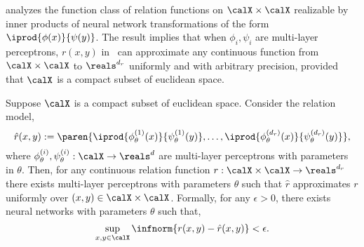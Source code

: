 
\citep{arxivInnerprodUnivApprox} analyzes the function class of relation functions on $\calX \times \calX$ realizable by inner products of neural network transformations of the form $\iprod{\phi(x)}{\psi(y)}$. The result implies that when $\phi_i, \psi_i$ are multi-layer perceptrons, $r(x,y)$ in~ can approximate any continuous function from $\calX \times \calX$ to $\reals^{d_r}$ uniformly and with arbitrary precision, provided that $\calX$ is a compact subset of euclidean space.

\begin{theorem}
    Suppose $\calX$ is a compact subset of euclidean space. Consider the relation model,
    \begin{equation*}
        \hat{r}(x, y) := \paren{\iprod{\phi_\theta^{(1)}(x)}{\psi_\theta^{(1)}(y)}, \ldots, \iprod{\phi_\theta^{(d_r)}(x)}{\psi_\theta^{(d_r)}(y)}},
    \end{equation*}
    \noindent where $\phi_\theta^{(i)}, \psi_\theta^{(i)}: \calX \to \reals^d$ are multi-layer perceptrons with parameters in $\theta$. Then, for any continuous relation function $r: \calX \times \calX \to \reals^{d_r}$ there exists multi-layer perceptrons with parameters $\theta$ such that $\hat{r}$ approximates $r$ uniformly over $(x,y) \in \calX \times \calX$. Formally, for any $\epsilon > 0$, there exists neural networks with parameters $\theta$ such that,
    \begin{equation*}
        \sup_{x, y \in \calX} \infnorm{r(x,y) - \hat{r}(x,y)} < \epsilon.
    \end{equation*}
\end{theorem}
